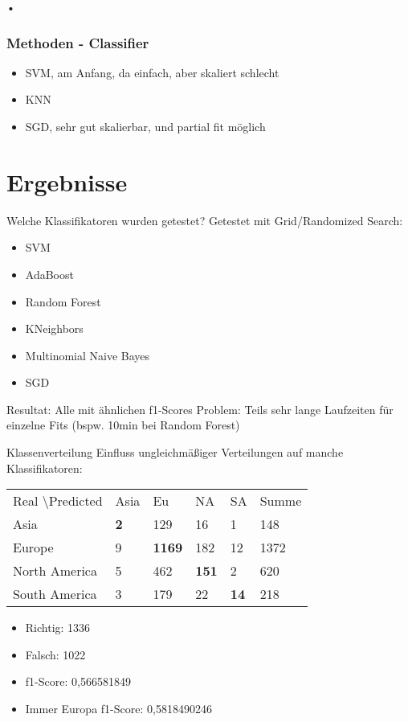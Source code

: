 \documentclass[12pt]{beamer}
\begin{document}
\begin{frame}{•}
\frametitle{Methoden - Classifier}
\begin{itemize}
\item SVM, am Anfang, da einfach, aber skaliert schlecht
\item KNN
\item SGD, sehr gut skalierbar, und partial fit möglich
\end{itemize}
\end{frame}


\section{Ergebnisse}
\begin{frame}[fragile]{Welche Klassifikatoren wurden getestet?}
Getestet mit Grid/Randomized Search:
\begin{itemize}
\item SVM 
\item AdaBoost
\item Random Forest
\item KNeighbors
\item Multinomial Naive Bayes
\item SGD
\end{itemize}

Resultat: Alle mit ähnlichen f1-Scores
Problem: Teils sehr lange Laufzeiten für einzelne Fits (bspw. 10min bei Random Forest)
\end{frame}
\begin{frame}[fragile]{Klassenverteilung}
Einfluss ungleichmäßiger Verteilungen auf manche Klassifikatoren: \\
\begin{tabular}{|l|l|l|l|l|l|}
\hline
Real \textbackslash Predicted & Asia & Eu & NA & SA & Summe\\
Asia & \textbf{2} & 129 & 16 & 1 & 148 \\
Europe & 9 & \textbf{1169} & 182 & 12 & 1372 \\
North America & 5 & 462 & \textbf{151} &2 & 620 \\
South America & 3 & 179 & 22 & \textbf{14} & 218 \\
\hline
\end{tabular}
\begin{itemize}
\item Richtig: 1336
\item Falsch: 1022
\item f1-Score: 0,566581849
\item Immer Europa f1-Score: 0,5818490246
\end{itemize}				

\end{frame}
\end{document}
